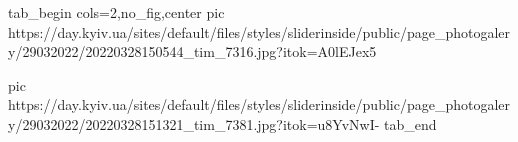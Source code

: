  
 
 
 
 

\ifcmt
  tab_begin cols=2,no_fig,center
     pic https://day.kyiv.ua/sites/default/files/styles/sliderinside/public/page_photogalery/29032022/20220328150544_tim_7316.jpg?itok=A0lEJex5

     pic https://day.kyiv.ua/sites/default/files/styles/sliderinside/public/page_photogalery/29032022/20220328151321_tim_7381.jpg?itok=u8YvNwI-
  tab_end
\fi
